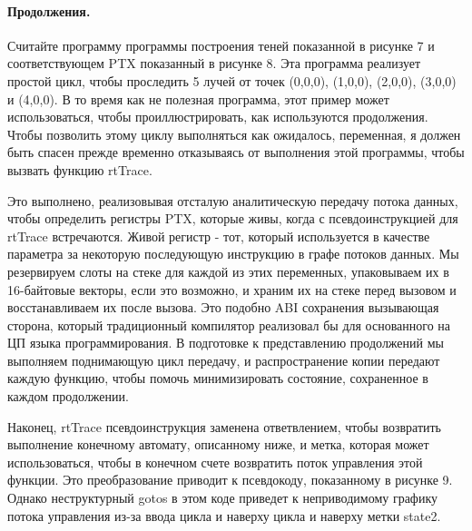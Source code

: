 \paragraph{Продолжения.} Считайте программу программы построения теней показанной в рисунке 7 и соответствующем PTX показанный в рисунке 8. Эта программа реализует простой цикл, чтобы проследить 5 лучей от точек (0,0,0), (1,0,0), (2,0,0), (3,0,0) и (4,0,0). В то время как не полезная программа, этот пример может использоваться, чтобы проиллюстрировать, как используются продолжения. Чтобы позволить этому циклу выполняться как ожидалось, переменная, я должен быть спасен прежде временно отказываясь от выполнения этой программы, чтобы вызвать функцию rtTrace. 

Это выполнено, реализовывая отсталую аналитическую передачу потока данных, чтобы определить регистры PTX, которые живы, когда с псевдоинструкцией для rtTrace встречаются. Живой регистр - тот, который используется в качестве параметра за некоторую последующую инструкцию в графе потоков данных. Мы резервируем слоты на стеке для каждой из этих переменных, упаковываем их в 16-байтовые векторы, если это возможно, и храним их на стеке перед вызовом и восстанавливаем их после вызова. Это подобно ABI сохранения вызывающая сторона, который традиционный компилятор реализовал бы для основанного на ЦП языка программирования. В подготовке к представлению продолжений мы выполняем поднимающую цикл передачу, и распространение копии передают каждую функцию, чтобы помочь минимизировать состояние, сохраненное в каждом продолжении. 

Наконец, rtTrace псевдоинструкция заменена ответвлением, чтобы возвратить выполнение конечному автомату, описанному ниже, и метка, которая может использоваться, чтобы в конечном счете возвратить поток управления этой функции. Это преобразование приводит к псевдокоду, показанному в рисунке 9.
Однако неструктурный gotos в этом коде приведет к неприводимому графику потока управления из-за ввода цикла и наверху цикла и наверху метки state2.

